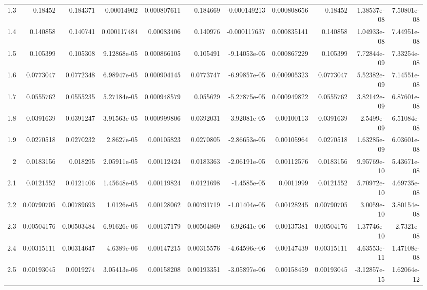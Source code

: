 {\begin{tabular}{rrrrrrrrrrr}
  1.3         & 0.18452    & 0.184371   &   0.00014902  &   0.000807611 & 0.184669   &  -0.000149213 &   0.000808656 & 0.18452    &   1.38537e-08 &   7.50801e-08 \\
  1.4         & 0.140858   & 0.140741   &   0.000117484 &   0.00083406  & 0.140976   &  -0.000117637 &   0.000835141 & 0.140858   &   1.04933e-08 &   7.44951e-08 \\
  1.5         & 0.105399   & 0.105308   &   9.12868e-05 &   0.000866105 & 0.105491   &  -9.14053e-05 &   0.000867229 & 0.105399   &   7.72844e-09 &   7.33254e-08 \\
  1.6         & 0.0773047  & 0.0772348  &   6.98947e-05 &   0.000904145 & 0.0773747  &  -6.99857e-05 &   0.000905323 & 0.0773047  &   5.52382e-09 &   7.14551e-08 \\
  1.7         & 0.0555762  & 0.0555235  &   5.27184e-05 &   0.000948579 & 0.055629   &  -5.27875e-05 &   0.000949822 & 0.0555762  &   3.82142e-09 &   6.87601e-08 \\
  1.8         & 0.0391639  & 0.0391247  &   3.91563e-05 &   0.000999806 & 0.0392031  &  -3.92081e-05 &   0.00100113  & 0.0391639  &   2.5499e-09  &   6.51084e-08 \\
  1.9         & 0.0270518  & 0.0270232  &   2.8627e-05  &   0.00105823  & 0.0270805  &  -2.86653e-05 &   0.00105964  & 0.0270518  &   1.63285e-09 &   6.03601e-08 \\
  2           & 0.0183156  & 0.018295   &   2.05911e-05 &   0.00112424  & 0.0183363  &  -2.06191e-05 &   0.00112576  & 0.0183156  &   9.95769e-10 &   5.43671e-08 \\
  2.1         & 0.0121552  & 0.0121406  &   1.45648e-05 &   0.00119824  & 0.0121698  &  -1.4585e-05  &   0.0011999   & 0.0121552  &   5.70972e-10 &   4.69735e-08 \\
  2.2         & 0.00790705 & 0.00789693 &   1.0126e-05  &   0.00128062  & 0.00791719 &  -1.01404e-05 &   0.00128245  & 0.00790705 &   3.0059e-10  &   3.80154e-08 \\
  2.3         & 0.00504176 & 0.00503484 &   6.91626e-06 &   0.00137179  & 0.00504869 &  -6.92641e-06 &   0.00137381  & 0.00504176 &   1.37746e-10 &   2.7321e-08  \\
  2.4         & 0.00315111 & 0.00314647 &   4.6389e-06  &   0.00147215  & 0.00315576 &  -4.64596e-06 &   0.00147439  & 0.00315111 &   4.63553e-11 &   1.47108e-08 \\
  2.5         & 0.00193045 & 0.0019274  &   3.05413e-06 &   0.00158208  & 0.00193351 &  -3.05897e-06 &   0.00158459  & 0.00193045 &  -3.12857e-15 &   1.62064e-12 \\
\hline
\end{tabular}
}
